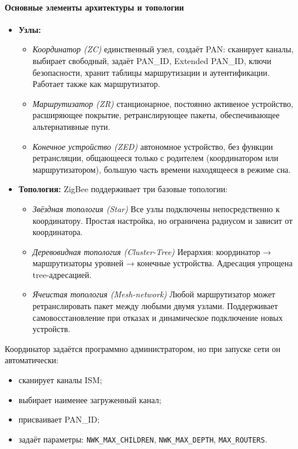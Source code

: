 \documentclass[14pt, a4paper]{extreport}
\begin{document}
\paragraph{Основные элементы архитектуры и топологии}
\begin{itemize}
  \item \textbf{Узлы:} 
    \begin{itemize}
      \item \emph{Координатор (ZC)} единственный узел, создаёт PAN: сканирует каналы, выбирает свободный, задаёт PAN\_ID, Extended PAN\_ID, ключи безопасности, хранит таблицы
      маршрутизации и аутентификации. Работает также как маршрутизатор.

      \item \emph{Маршрутизатор (ZR)} станционарное, постоянно активеное устройство, расширяющее покрытие, ретранслирующее пакеты, обеспечивающее альтернативные пути.
      
      \item \emph{Конечное устройство (ZED)} автономное устройство, без функции ретрансляции, общающееся только с родителем (координатором или маршрутизатором), большую часть
      времени находящееся в режиме сна.

    \end{itemize}
  \item \textbf{Топология:} ZigBee поддерживает три базовые топологии:
    \begin{itemize}
      \item \emph{Звёздная топология (Star)} Все узлы подключены непосредственно к координатору. Простая настройка, но ограничена радиусом и зависит от координатора.

      \item \emph{Деревовидная топология (Cluster-Tree)} Иерархия: координатор → маршрутизаторы уровней → конечные устройства. Адресация упрощена tree-адресацией.

      \item \emph{Ячеистая топология (Mesh-network)} Любой маршрутизатор может ретранслировать пакет между любыми двумя узлами. Поддерживает самовосстановление при отказах
      и динамическое подключение новых устройств.

    \end{itemize}
\end{itemize}

Координатор задаётся программно администратором, но при запуске сети он автоматически:
\begin{itemize}
    \item сканирует каналы ISM;
    \item выбирает наименее загруженный канал;
    \item присваивает PAN\_ID;
    \item задаёт параметры: \texttt{NWK\_MAX\_CHILDREN}, \texttt{NWK\_MAX\_DEPTH}, \texttt{MAX\_ROUTERS}.
\end{itemize}
\end{document}
